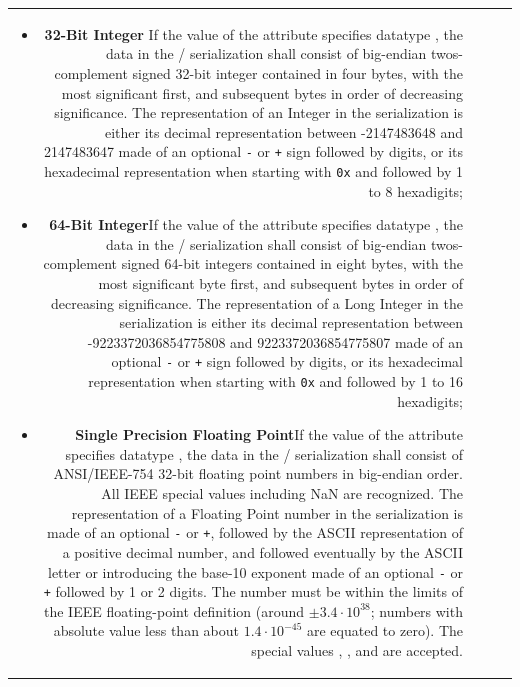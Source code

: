 \begin{tabular}{RRCp{0.8\textwidth}}
\begin{center}
{\begin{itemize}
\item {\bf 32-Bit Integer }\quad If the value of the {}
attribute specifies datatype {},
the data in the / serialization shall consist of 
big-endian twos-complement signed 32-bit
integer contained in four bytes, with the most significant first, 
and subsequent bytes in order of decreasing significance. 
  The representation of an Integer in the  serialization
  is either its decimal representation between -2147483648 and 2147483647
  made of an optional {\tt-} or {\tt+} sign followed by digits,
  or its hexadecimal representation when starting with {\tt0x}
  and followed by 1 to 8 hexadigits;

\item {\bf 64-Bit Integer}\quad If the value of the {}
attribute specifies datatype {},
the data in the / serialization shall consist of 
big-endian twos-complement signed 64-bit integers
contained in eight bytes, with the most significant byte first,
and subsequent bytes in order of decreasing significance. 
The representation of a Long Integer in the  serialization
  is either its decimal representation between -9223372036854775808
  and 9223372036854775807
  made of an optional {\tt-} or {\tt+} sign followed by digits,
  or its hexadecimal representation when starting with {\tt0x}
  and followed by 1 to 16 hexadigits;


\item {\bf Single Precision Floating Point}\quad If
the value of the {} attribute specifies datatype {},
the data in the / serialization shall consist of 
ANSI/IEEE-754 32-bit floating point numbers in big-endian order. 
All IEEE special values including NaN are recognized.
The representation of a Floating Point number in the 
 serialization is made of an optional {\tt-} or {\tt+},
followed by the ASCII representation of a positive decimal number,
and followed eventually by the ASCII letter  or  
introducing the base-10 exponent made of an optional {\tt-} or {\tt+}
followed by 1 or 2 digits. The number must be within the limits of the
IEEE floating-point definition (around $\pm3.4\cdot10^{38}$; numbers with
absolute value less than about $1.4\cdot10^{-45}$ are equated to zero).
The special
values , , and  are accepted.



\end{itemize}}
\end{center}
\end{tabular}
